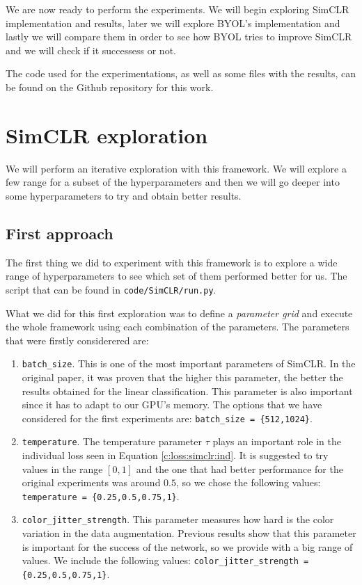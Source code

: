 We are now ready to perform the experiments. We will begin exploring SimCLR implementation and results, later we will explore BYOL's implementation and lastly we will compare them in order to see how BYOL tries to improve SimCLR and we will check if it successess or not.

The code used for the experimentations, as well as some files with the results, can be found on the Github repository for this work.

\section{SimCLR exploration}
We will perform an iterative exploration with this framework. We will explore a few range for a subset of the hyperparameters and then we will go deeper into some hyperparameters to try and obtain better results.

\subsection{First approach}
\label{experiments:simclr:first}

The first thing we did to experiment with this framework is to explore a wide range of hyperparameters to see which set of them performed better for us. The script that can be found in \lstinline{code/SimCLR/run.py}.

What we did for this first exploration was to define a \emph{parameter grid} and execute the whole framework using each combination of the parameters. The parameters that were firstly considerered are:
\begin{enumerate}
\item \lstinline{batch_size}. This is one of the most important parameters of SimCLR. In the original paper, it was proven that the higher this parameter, the better the results obtained for the linear classification. This parameter is also important since it has to adapt to our GPU's memory. The options that we have considered for the first experiments are: \lstinline|batch_size = {512,1024}|.

\item \lstinline{temperature}. The temperature parameter $\tau$ plays an important role in the individual loss seen in Equation \eqref{c:loss:simclr:ind}. It is suggested to try values in the range $[0,1]$ and the one that had better performance for the original experiments was around $0.5$, so we chose the following values: \lstinline|temperature = {0.25,0.5,0.75,1}|.

\item \lstinline{color_jitter_strength}. This parameter measures how hard is the color variation in the data augmentation. Previous results show that this parameter is important for the success of the network, so we provide with a big range of values. We include the following values: \lstinline|color_jitter_strength = {0.25,0.5,0.75,1}|.
\end{enumerate}

